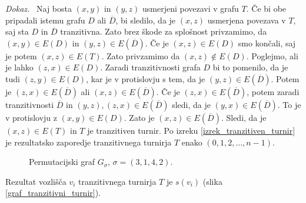 \documentclass[a4paper, 12pt]{book}
\newenvironment{dokaz}{\emph{Dokaz.}\ }{\hspace{\fill}{$\Box$}}
\begin{document}
\begin{dokaz}
    Naj bosta $(x, y)$ in $(y, z)$ usmerjeni povezavi v grafu $T$. Če bi obe pripadali istemu grafu $D$ ali $\overline{D}$, bi sledilo, da je $(x, z)$ usmerjena povezava v $T$, saj sta $D$ in $\overline{D}$ tranzitivna. Zato brez škode za splošnost privzamimo, da $(x, y) \in E(D) $ in $(y, z) \in E(\overline{D})$. Če je $(x, z) \in E(D)$ smo končali, saj je potem $(x, z) \in E(T)$. Zato privzamimo da $(x, z) \notin E(D)$. Poglejmo, ali je lahko $(z, x) \in E(D)$. Zaradi tranzitivnosti grafa $D$ bi to pomenilo, da je tudi $(z, y) \in E(D)$, kar je v protislovju s tem, da je  $(y, z) \in E(\overline{D})$. Potem je $(z, x) \in E(\overline{D})$ ali $(x, z) \in E(\overline{D})$. Če je $(z, x) \in E(\overline{D})$, potem zaradi tranzitivnosti $\overline{D}$ in $(y, z), (z, x) \in E(\overline{D})$ sledi, da je $(y, x) \in E(\overline{D})$. To je v protislovju z $(x, y) \in E(D)$. Zato je $(x, z) \in E(\overline{D})$. Sledi, da je $(x, z) \in E(T)$ in $T$ je tranzitiven turnir. Po izreku \ref{izrek_tranzitiven_turnir} je rezultatsko zaporedje tranzitivnega turnirja $T$ enako $(0, 1, 2, \dots, n-1)$. 
    \begin{figure}[h]
        \begin{center}
        \end{center}
        \caption{Permutacijski graf $G_\sigma$, $\sigma = (3, 1, 4, 2)$.}
        \label{graf_permutacije3142}
    \end{figure}
    Rezultat vozlišča $v_i$ tranzitivnega turnirja $T$ je $s(v_i)$ (slika \ref{graf_tranzitivni_turnir}).
    

\end{dokaz}
\end{document}
